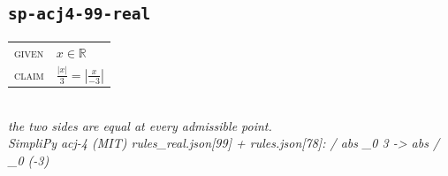 \documentclass[11pt]{article}
\begin{document}
\subsection*{\texttt{sp-acj4-99-real}}
\begin{tabular}{@{}l@{\quad}l@{}}
\textsc{given} & $x \in \mathbb{R}$ \\[4pt]
\textsc{claim} & $\displaystyle \frac{\left|x\right|}{3} = \left|\frac{x}{-3}\right|$ \\
\end{tabular}\\[2pt]
{\small\emph{the two sides are equal at every admissible point.}}\\
\emph{SimpliPy acj-4 (MIT) rules\_real.json[99] + rules.json[78]: / abs \_0 3  ->  abs / \_0 (-3)}\\
\end{document}
